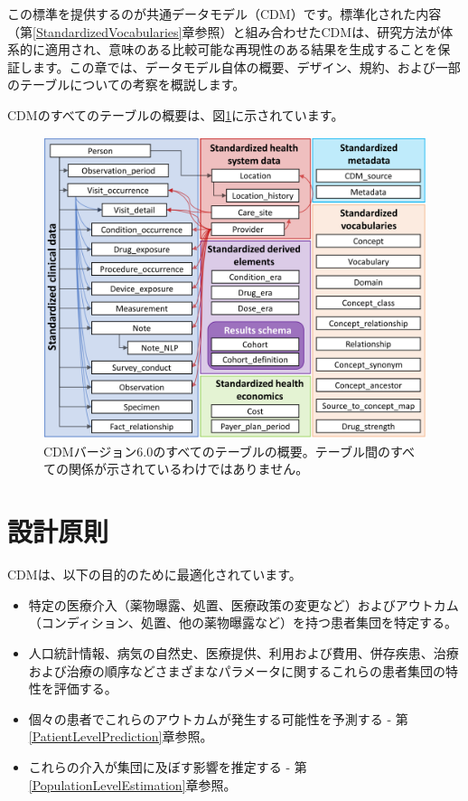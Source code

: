 \documentclass[
  11pt]{book}
\providecommand{\tightlist}{%
  \setlength{\itemsep}{0pt}\setlength{\parskip}{0pt}}
\theoremstyle{definition}
\theoremstyle{definition}
\theoremstyle{definition}
\theoremstyle{definition}
\theoremstyle{remark}
\begin{document}
この標準を提供するのが共通データモデル（CDM）です。標準化された内容（第\ref{StandardizedVocabularies}章参照）と組み合わせたCDMは、研究方法が体系的に適用され、意味のある比較可能な再現性のある結果を生成することを保証します。この章では、データモデル自体の概要、デザイン、規約、および一部のテーブルについての考察を概説します。

CDMのすべてのテーブルの概要は、図\ref{fig:cdmDiagram}に示されています。 

\begin{figure}
\includegraphics[width=1\linewidth]{images/CommonDataModel/cdmDiagram} \caption{CDMバージョン6.0のすべてのテーブルの概要。テーブル間のすべての関係が示されているわけではありません。}\label{fig:cdmDiagram}
\end{figure}

\section{設計原則}\label{ux8a2dux8a08ux539fux5247}

CDMは、以下の目的のために最適化されています。 

\begin{itemize}
\tightlist
\item
  特定の医療介入（薬物曝露、処置、医療政策の変更など）およびアウトカム（コンディション、処置、他の薬物曝露など）を持つ患者集団を特定する。
\item
  人口統計情報、病気の自然史、医療提供、利用および費用、併存疾患、治療および治療の順序などさまざまなパラメータに関するこれらの患者集団の特性を評価する。
\item
  個々の患者でこれらのアウトカムが発生する可能性を予測する - 第\ref{PatientLevelPrediction}章参照。
\item
  これらの介入が集団に及ぼす影響を推定する - 第\ref{PopulationLevelEstimation}章参照。
\end{itemize}
\end{document}
